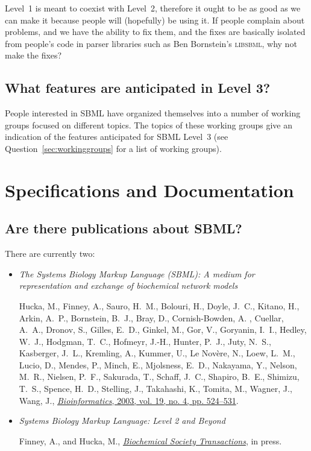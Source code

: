 \documentclass{sbmlfaq}
\begin{document}
Level~1 is meant to coexist with Level~2, therefore it ought to be as good
as we can make it because people will (hopefully) be using it.  If people
complain about problems, and we have the ability to fix them, and the fixes
are basically isolated from people's code in parser libraries such as Ben
Bornstein's \textsc{libsbml}, why not make the fixes?



\subsection{What features are anticipated in Level 3?}

People interested in SBML have organized themselves into a number of
working groups focused on different topics.  The topics of these working
groups give an indication of the features anticipated for SBML Level~3
(see Question~\ref{sec:workinggroups} for a list of working groups).


\section{Specifications and Documentation}
\label{sec:docs}

\subsection{Are there publications about SBML?}

There are currently two:

\begin{itemize}
  
\item \emph{The Systems Biology Markup Language (SBML): A
    medium for representation and exchange of biochemical network
    models}
    
    Hucka, M., Finney, A., Sauro, H.~M., Bolouri, H., Doyle, J.~C., Kitano,
    H., Arkin, A.~P., Bornstein, B.~J., Bray, D., Cornish-Bowden, A. ,
    Cuellar, A.~A., Dronov, S., Gilles, E.~D., Ginkel, M., Gor, V.,
    Goryanin, I.~I., Hedley, W.~J., Hodgman, T.~C., Hofmeyr, J.-H., Hunter,
    P.~J., Juty, N.~S., Kasberger, J.~L., Kremling, A., Kummer, U., Le
    Nov\`{e}re, N., Loew, L.~M., Lucio, D., Mendes, P., Minch, E.,
    Mjolsness, E.~D., Nakayama, Y., Nelson, M.~R., Nielsen, P.~F.,
    Sakurada, T., Schaff, J.~C., Shapiro, B.~E., Shimizu, T.~S., Spence,
    H.~D., Stelling, J., Takahashi, K., Tomita, M., Wagner, J., Wang, J.,
    \href{http://bioinformatics.oupjournals.org/cgi/reprint/19/4/524?ijkey=BzZTZ.dDZEXp0U&keytype=ref&siteid=bioinfo}{\emph{Bioinformatics},
      2003, vol. 19, no. 4, pp. 524--531}.

\item \emph{Systems Biology Markup Language: Level 2 and Beyond}

    Finney, A., and Hucka, M.,
    \href{http://www.biochemsoctrans.org/}{\emph{Biochemical Society
        Transactions}}, in press.

\end{itemize}
\end{document}
